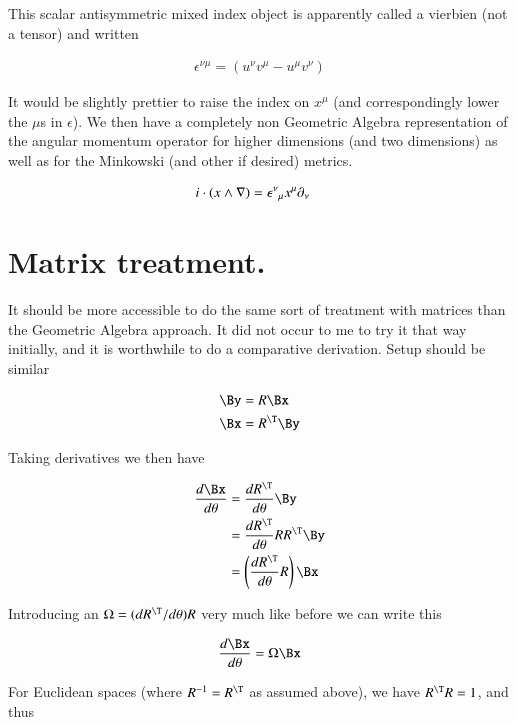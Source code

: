 This scalar antisymmetric mixed index object is apparently called a vierbien (not a tensor) and written 

\begin{align}\label{eqn:rotationGen:foo43}
\epsilon^{\nu\mu} = (u^\nu v^\mu - u^\mu v^\nu) 
\end{align}

It would be slightly prettier to raise the index on $x^\mu$ (and correspondingly lower the $\mu$s in $\epsilon$).  We then have a completely non Geometric Algebra representation of the angular momentum operator for higher dimensions (and two dimensions) as well as for the Minkowski (and other if desired) metrics.

\begin{align}\label{eqn:rotationGen:foo44}
i \cdot (x \wedge \nabla) 
&=
{\epsilon^{\nu}}_\mu x^\mu \partial_\nu 
\end{align}

\section{Matrix treatment.}

It should be more accessible to do the same sort of treatment with matrices than the Geometric Algebra approach.  It did not occur to me to try it that way initially, and it is worthwhile to do a comparative derivation.  Setup should be similar

\begin{align}\label{eqn:rotationGen:boo1}
\By &= R \Bx \\
\Bx &= R^\T \By 
\end{align}

Taking derivatives we then have

\begin{align*}
\frac{d \Bx}{d\theta}
&= \frac{d R^\T}{d\theta} \By \\
&= \frac{d R^\T}{d\theta} R R^\T \By \\
&= \left( \frac{d R^\T}{d\theta} R \right) \Bx \\
\end{align*}

Introducing an $\Omega = (dR^\T/d\theta) R$ very much like before we can write this

\begin{align}\label{eqn:rotationGen:boo2}
\frac{d \Bx}{d\theta} = \Omega \Bx
\end{align}

For Euclidean spaces (where $R^{-1} = R^\T$ as assumed above), we have $R^\T R = 1$, and thus

